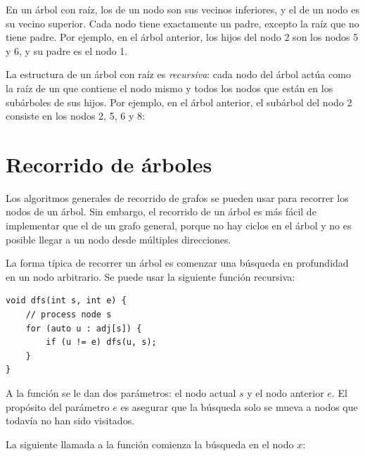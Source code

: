 En un árbol con raíz, los  de un nodo
son sus vecinos inferiores, y el  de un nodo
es su vecino superior.
Cada nodo tiene exactamente un padre,
excepto la raíz que no tiene padre.
Por ejemplo, en el árbol anterior,
los hijos del nodo 2 son los nodos 5 y 6,
y su padre es el nodo 1.


La estructura de un árbol con raíz es \emph{recursiva}:
cada nodo del árbol actúa como la raíz de un 
que contiene el nodo mismo y todos los nodos
que están en los subárboles de sus hijos.
Por ejemplo, en el árbol anterior, el subárbol del nodo 2
consiste en los nodos 2, 5, 6 y 8:
\begin{center}
\end{center}

\section{Recorrido de árboles}

Los algoritmos generales de recorrido de grafos
se pueden usar para recorrer los nodos de un árbol.
Sin embargo, el recorrido de un árbol es más fácil de implementar que
el de un grafo general, porque
no hay ciclos en el árbol y no es
posible llegar a un nodo desde múltiples direcciones.

La forma típica de recorrer un árbol es comenzar
una búsqueda en profundidad en un nodo arbitrario.
Se puede usar la siguiente función recursiva:

\begin{lstlisting}
void dfs(int s, int e) {
    // process node s
    for (auto u : adj[s]) {
        if (u != e) dfs(u, s);
    }
}
\end{lstlisting}

A la función se le dan dos parámetros: el nodo actual $s$
y el nodo anterior $e$.
El propósito del parámetro $e$ es asegurar
que la búsqueda solo se mueva a nodos
que todavía no han sido visitados.

La siguiente llamada a la función comienza la búsqueda
en el nodo $x$:

